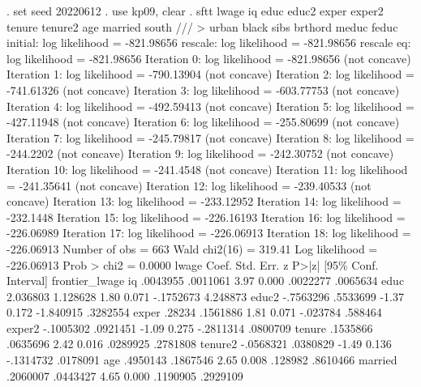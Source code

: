 . set seed 20220612
{\smallskip}
. use kp09, clear
{\smallskip}
. sftt lwage iq educ educ2 exper exper2 tenure tenure2 age married south ///
>          urban black sibs brthord meduc feduc
{\smallskip}
initial:       log likelihood = -821.98656
rescale:       log likelihood = -821.98656
rescale eq:    log likelihood = -821.98656
Iteration 0:   log likelihood = -821.98656  (not concave)
Iteration 1:   log likelihood = -790.13904  (not concave)
Iteration 2:   log likelihood = -741.61326  (not concave)
Iteration 3:   log likelihood = -603.77753  (not concave)
Iteration 4:   log likelihood = -492.59413  (not concave)
Iteration 5:   log likelihood = -427.11948  (not concave)
Iteration 6:   log likelihood = -255.80699  (not concave)
Iteration 7:   log likelihood = -245.79817  (not concave)
Iteration 8:   log likelihood =  -244.2202  (not concave)
Iteration 9:   log likelihood = -242.30752  (not concave)
Iteration 10:  log likelihood =  -241.4548  (not concave)
Iteration 11:  log likelihood = -241.35641  (not concave)
Iteration 12:  log likelihood = -239.40533  (not concave)
Iteration 13:  log likelihood = -233.12952  
Iteration 14:  log likelihood =  -232.1448  
Iteration 15:  log likelihood = -226.16193  
Iteration 16:  log likelihood = -226.06989  
Iteration 17:  log likelihood = -226.06913  
Iteration 18:  log likelihood = -226.06913  
{\smallskip}
{}
{\smallskip}
                                                Number of obs     =        663
                                                Wald chi2(16)     =     319.41
Log likelihood = -226.06913                     Prob > chi2       =     0.0000
{\smallskip}
         lwage {\VBAR}      Coef.   Std. Err.      z    P>|z|     [95\% Conf. Interval]
frontier_lwage {\VBAR}
            iq {\VBAR}   .0043955   .0011061     3.97   0.000     .0022277    .0065634
          educ {\VBAR}   2.036803   1.128628     1.80   0.071    -.1752673    4.248873
         educ2 {\VBAR}  -.7563296   .5533699    -1.37   0.172    -1.840915    .3282554
         exper {\VBAR}     .28234   .1561886     1.81   0.071     -.023784     .588464
        exper2 {\VBAR}  -.1005302   .0921451    -1.09   0.275    -.2811314    .0800709
        tenure {\VBAR}   .1535866   .0635696     2.42   0.016     .0289925    .2781808
       tenure2 {\VBAR}  -.0568321   .0380829    -1.49   0.136    -.1314732    .0178091
           age {\VBAR}   .4950143   .1867546     2.65   0.008      .128982    .8610466
       married {\VBAR}   .2060007   .0443427     4.65   0.000     .1190905    .2929109
